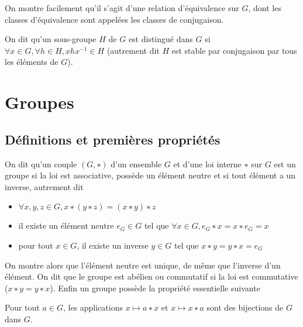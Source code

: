 \begin{rem}
On montre facilement qu'il s'agit d'une relation d'équivalence sur $G$, dont les classes d'équivalence sont appelées les classes de conjugaison.
\end{rem}

\begin{de}
On dit qu'un sous-groupe $H$ de $G$ est distingué dans $G$ si
$\forall x \in G, \forall h \in H, xhx^{-1} \in H$
(autrement dit $H$ est stable par conjugaison par tous les éléments de $G$).
\end{de}

\section{Groupes}

\subsection{Définitions et premières propriétés}

\begin{de}
On dit qu'un couple $(G,∗)$ d'un ensemble $G$ et d'une loi interne $∗$ sur $G$ est un groupe si la loi est associative, possède un élément neutre et si tout élément a un inverse, autrement dit
\begin{itemize}
\itemsep1pt\parskip0pt
\item $\forall x,y,z \in G, x ∗ (y ∗ z) = (x ∗ y) ∗ z$
\item il existe un élément neutre $e_G \in G$ tel que $\forall x \in G, e_G ∗ x = x ∗ e_G = x$
\item pour tout $x \in G$, il existe un inverse $y \in G$ tel que $x ∗ y = y ∗ x = e_G$
\end{itemize}
\end{de}

\begin{rem}
On montre alors que l'élément neutre est unique, de même que l'inverse d'un élément. On dit que le groupe est abélien ou commutatif si la loi est commutative ($x ∗ y = y ∗ x$). Enfin un groupe possède la propriété essentielle suivante
\end{rem}

\begin{prop}
Pour tout $a \in G$, les applications $x \mapsto a ∗ x$ et $x \mapsto x ∗ a$ sont des bijections de $G$ dans $G$.
\end{prop}

